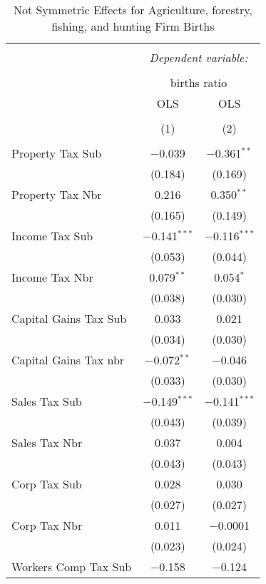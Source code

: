 
\begin{table}[!htbp] \centering 
  \caption{Not Symmetric Effects for  Agriculture, forestry, fishing, and hunting Firm Births} 
  \label{11noequality} 
\footnotesize 
\begin{tabular}{@{\extracolsep{5pt}}lcc} 
\\[-1.8ex]\hline 
\hline \\[-1.8ex] 
 & \multicolumn{2}{c}{\textit{Dependent variable:}} \\ 
\cline{2-3} 
\\[-1.8ex] & \multicolumn{2}{c}{births ratio} \\ 
 & OLS & OLS \\ 
\\[-1.8ex] & (1) & (2)\\ 
\hline \\[-1.8ex] 
 Property Tax Sub & $-$0.039 & $-$0.361$^{**}$ \\ 
  & (0.184) & (0.169) \\ 
  Property Tax Nbr & 0.216 & 0.350$^{**}$ \\ 
  & (0.165) & (0.149) \\ 
  Income Tax Sub & $-$0.141$^{***}$ & $-$0.116$^{***}$ \\ 
  & (0.053) & (0.044) \\ 
  Income Tax Nbr & 0.079$^{**}$ & 0.054$^{*}$ \\ 
  & (0.038) & (0.030) \\ 
  Capital Gains Tax Sub & 0.033 & 0.021 \\ 
  & (0.034) & (0.030) \\ 
  Capital Gains Tax nbr & $-$0.072$^{**}$ & $-$0.046 \\ 
  & (0.033) & (0.030) \\ 
  Sales Tax Sub & $-$0.149$^{***}$ & $-$0.141$^{***}$ \\ 
  & (0.043) & (0.039) \\ 
  Sales Tax Nbr & 0.037 & 0.004 \\ 
  & (0.043) & (0.043) \\ 
  Corp Tax Sub & 0.028 & 0.030 \\ 
  & (0.027) & (0.027) \\ 
  Corp Tax Nbr & 0.011 & $-$0.0001 \\ 
  & (0.023) & (0.024) \\ 
  Workers Comp Tax Sub & $-$0.158 & $-$0.124 \\ 

\end{tabular}
\end{table}
